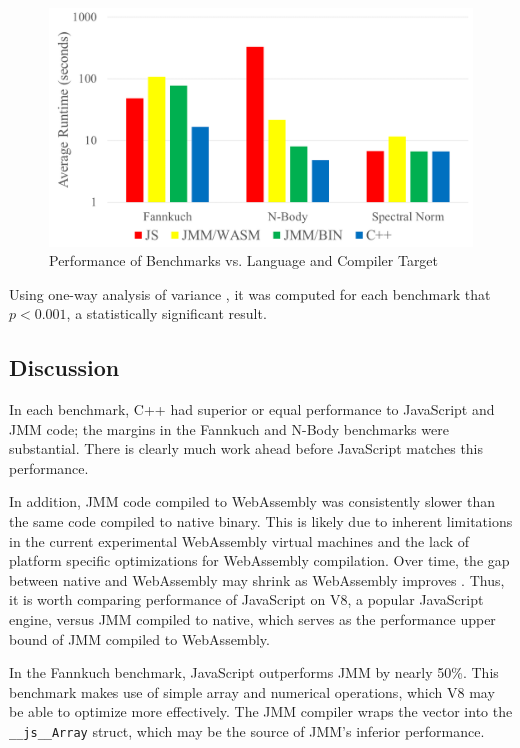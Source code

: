 \documentclass[12pt]{article}
\begin{document}
	\begin{figure}[h]
		\centering
		\includegraphics[scale=0.4]{chart.png}
		\caption{Performance of Benchmarks vs. Language and Compiler Target}
	\end{figure}

	Using one-way analysis of variance \cite{Lane}, it was computed for each benchmark that $p < 0.001$, a statistically significant result.
	
	\subsection{Discussion}
	
	In each benchmark, C++ had superior or equal performance to JavaScript and JMM code; the margins in the Fannkuch and N-Body benchmarks were substantial. There is clearly much work ahead before JavaScript matches this performance.
	
	In addition, JMM code compiled to WebAssembly was consistently slower than the same code compiled to native binary. This is likely due to inherent limitations in the current experimental WebAssembly virtual machines and the lack of platform specific optimizations for WebAssembly compilation. Over time, the gap between native and WebAssembly may shrink as WebAssembly improves \cite{Clark2017}. Thus, it is worth comparing performance of JavaScript on V8, a popular JavaScript engine, versus JMM compiled to native, which serves as the performance upper bound of JMM compiled to WebAssembly.
	
	In the Fannkuch benchmark, JavaScript outperforms JMM by nearly 50\%. This benchmark makes use of simple array and numerical operations, which V8 may be able to optimize more effectively. The JMM compiler wraps the vector into the \texttt{\_\_js\_\_Array} struct, which may be the source of JMM's inferior performance.
\end{document}

